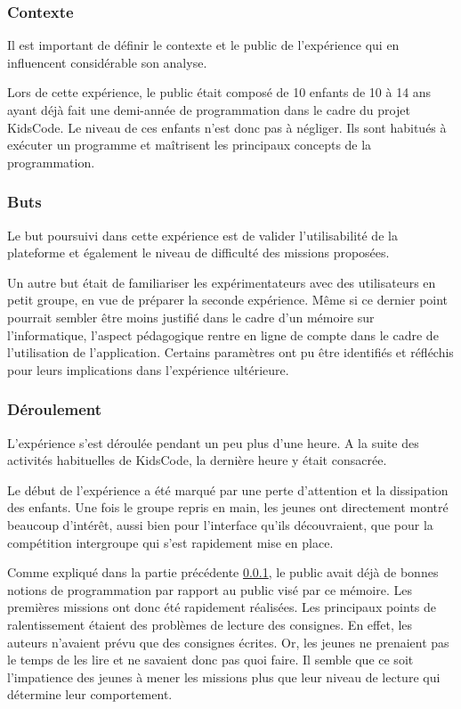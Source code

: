 \subsubsection{Contexte}
\label{context-kidscode}
Il est important de définir le contexte et le public de l'expérience qui en influencent considérable son analyse.

Lors de cette expérience, le public était composé de 10 enfants de 10 à 14 ans ayant déjà fait une demi-année de programmation dans le cadre du projet KidsCode. Le niveau de ces enfants n'est donc pas à négliger. Ils sont habitués à exécuter un programme et maîtrisent les principaux concepts de la programmation.

\subsubsection{Buts}
Le but poursuivi dans cette expérience est de valider l'utilisabilité de la plateforme et également le niveau de difficulté des \glspl{mission} proposées.

Un autre but était de familiariser les expérimentateurs avec des utilisateurs en petit groupe, en vue de préparer la seconde expérience.
Même si ce dernier point pourrait sembler être moins justifié dans le cadre d'un mémoire sur l'informatique, l'aspect pédagogique rentre en ligne de compte dans le cadre de l'utilisation de l'application. Certains paramètres ont pu être identifiés et réfléchis pour leurs implications dans l'expérience ultérieure.

\subsubsection{Déroulement}
L'expérience s'est déroulée pendant un peu plus d'une heure. A la suite des activités habituelles de KidsCode, la dernière heure y était consacrée.

Le début de l'expérience a été marqué par une perte d'attention et la dissipation des enfants. Une fois le groupe repris en main, les jeunes ont directement montré beaucoup d'intérêt, aussi bien pour l'interface qu'ils découvraient, que pour la compétition intergroupe qui s'est rapidement mise en place.

Comme expliqué dans la partie précédente \ref{context-kidscode}, le public avait déjà de bonnes notions de programmation par rapport au public visé par ce mémoire. Les premières \glspl{mission} ont donc été rapidement réalisées. Les principaux points de ralentissement étaient des problèmes de lecture des consignes. En effet, les auteurs n'avaient prévu que des consignes écrites. Or, les jeunes ne prenaient pas le temps de les lire et ne savaient donc pas quoi faire. Il semble que ce soit l'impatience des jeunes à mener les \glspl{mission} plus que leur niveau de lecture qui détermine leur comportement.

